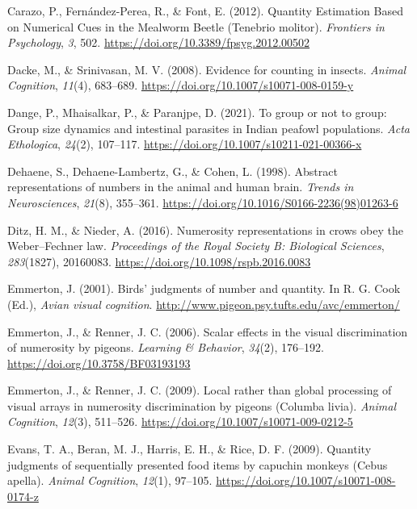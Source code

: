 \documentclass[
  ,pub,floatsintext]{apa6}
\newlength{\cslhangindent}
\newlength{\cslentryspacingunit} %
\newenvironment{CSLReferences}[2] %
 {%
  \setlength{\parindent}{0pt}
  \ifodd #1
  \let\oldpar\par
  \def\par{\hangindent=\cslhangindent\oldpar}
  \fi
  \setlength{\parskip}{#2\cslentryspacingunit}
 }%
 {}
\begin{document}
\begin{CSLReferences}{1}{0}
\leavevmode{}%
Carazo, P., Fernández-Perea, R., \& Font, E. (2012). Quantity {Estimation Based} on {Numerical Cues} in the {Mealworm Beetle} ({Tenebrio} molitor). \emph{Frontiers in Psychology}, \emph{3}, 502. \url{https://doi.org/10.3389/fpsyg.2012.00502}

\leavevmode{}%
Dacke, M., \& Srinivasan, M. V. (2008). Evidence for counting in insects. \emph{Animal Cognition}, \emph{11}(4), 683--689. \url{https://doi.org/10.1007/s10071-008-0159-y}

\leavevmode{}%
Dange, P., Mhaisalkar, P., \& Paranjpe, D. (2021). To group or not to group: Group size dynamics and intestinal parasites in {Indian} peafowl populations. \emph{Acta Ethologica}, \emph{24}(2), 107--117. \url{https://doi.org/10.1007/s10211-021-00366-x}

\leavevmode{}%
Dehaene, S., Dehaene-Lambertz, G., \& Cohen, L. (1998). Abstract representations of numbers in the animal and human brain. \emph{Trends in Neurosciences}, \emph{21}(8), 355--361. \url{https://doi.org/10.1016/S0166-2236(98)01263-6}

\leavevmode{}%
Ditz, H. M., \& Nieder, A. (2016). Numerosity representations in crows obey the {Weber}--{Fechner} law. \emph{Proceedings of the Royal Society B: Biological Sciences}, \emph{283}(1827), 20160083. \url{https://doi.org/10.1098/rspb.2016.0083}

\leavevmode{}%
Emmerton, J. (2001). Birds' judgments of number and quantity. In R. G. Cook (Ed.), \emph{Avian visual cognition}. \url{http://www.pigeon.psy.tufts.edu/avc/emmerton/}

\leavevmode{}%
Emmerton, J., \& Renner, J. C. (2006). Scalar effects in the visual discrimination of numerosity by pigeons. \emph{Learning \& Behavior}, \emph{34}(2), 176--192. \url{https://doi.org/10.3758/BF03193193}

\leavevmode{}%
Emmerton, J., \& Renner, J. C. (2009). Local rather than global processing of visual arrays in numerosity discrimination by pigeons ({Columba} livia). \emph{Animal Cognition}, \emph{12}(3), 511--526. \url{https://doi.org/10.1007/s10071-009-0212-5}

\leavevmode{}%
Evans, T. A., Beran, M. J., Harris, E. H., \& Rice, D. F. (2009). Quantity judgments of sequentially presented food items by capuchin monkeys ({Cebus} apella). \emph{Animal Cognition}, \emph{12}(1), 97--105. \url{https://doi.org/10.1007/s10071-008-0174-z}


\end{CSLReferences}
\end{document}
